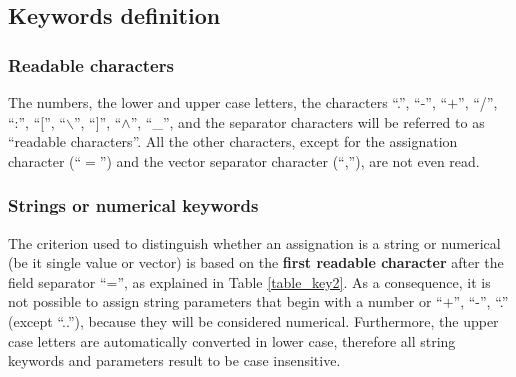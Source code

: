 \subsection{Keywords definition}

\subsubsection{Readable characters}
 The numbers, the lower and upper case letters, the characters ``.'', ``-'', ``$+$'', ``/'', ``:'', ``['', ``$\backslash$'', ``]'',  ``$\wedge$'', ``\_'', and the separator characters will be referred to as ``readable characters''. All the other characters, except for the assignation character (``$=$'') and the vector separator character (``,''), are not even read.\\

\subsubsection{Strings or numerical keywords}
The criterion used to distinguish whether an assignation is a string or numerical (be it single value or vector) is based on the {\bf first readable character} after the field separator ``='', as explained in Table \ref{table_key2}. 
As a consequence, it is not possible to assign string parameters that begin with a number or ``$+$'', ``-'', ``.'' (except ``..''), because they will be considered numerical.
Furthermore, the upper case letters are automatically converted in lower case, therefore all string keywords and parameters result to be case insensitive.

